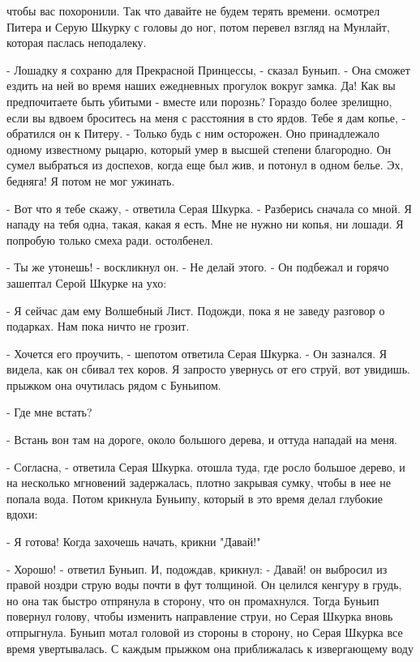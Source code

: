 чтобы вас похоронили. Так что давайте не будем терять времени.
 осмотрел Питера и Серую Шкурку с головы до ног, потом перевел 
взгляд на Мунлайт, которая паслась неподалеку.
\par- Лошадку я сохраню для Прекрасной Принцессы, - сказал Буньип. - 
Она сможет ездить на ней во время наших ежедневных прогулок вокруг 
замка. Да! Как вы предпочитаете быть убитыми - вместе или порознь? 
Гораздо более зрелищно, если вы вдвоем броситесь на меня с расстояния 
в сто ярдов. Тебе я дам копье, - обратился он к Питеру. - Только будь 
с ним осторожен. Оно принадлежало одному известному рыцарю, который 
умер в высшей степени благородно. Он сумел выбраться из доспехов, 
когда еще был жив, и потонул в одном белье. Эх, бедняга! Я потом не 
мог ужинать.
\par- Вот что я тебе скажу, - ответила Серая Шкурка. - Разберись 
сначала со мной. Я нападу на тебя одна, такая, какая я есть. Мне не 
нужно ни копья, ни лошади. Я попробую только смеха ради.
 остолбенел.
\par- Ты же утонешь! - воскликнул он. - Не делай этого. - Он подбежал 
и горячо зашептал Серой Шкурке на ухо:
\par- Я сейчас дам ему Волшебный Лист. Подожди, пока я не заведу 
разговор о подарках. Нам пока ничто не грозит.
\par- Хочется его проучить, - шепотом ответила Серая Шкурка. - Он 
зазнался. Я видела, как он сбивал тех коров. Я запросто увернусь от 
его струй, вот увидишь.
 прыжком она очутилась рядом с Буньипом.
\par- Где мне встать?
\par- Встань вон там на дороге, около большого дерева, и оттуда 
нападай на меня.
\par- Согласна, - ответила Серая Шкурка.
 отошла туда, где росло большое дерево, и на несколько 
мгновений задержалась, плотно закрывая сумку, чтобы в нее не попала 
вода. Потом крикнула Буньипу, который в это время делал глубокие 
вдохи:
\par- Я готова! Когда захочешь начать, крикни "Давай!"
\par- Хорошо! - ответил Буньип. И, подождав, крикнул: - Давай!
 он выбросил из правой ноздри струю воды почти в фут 
толщиной. Он целился кенгуру в грудь, но она так быстро отпрянула в 
сторону, что он промахнулся. Тогда Буньип повернул голову, чтобы 
изменить направление струи, но Серая Шкурка вновь отпрыгнула. Буньип 
мотал головой из стороны в сторону, но Серая Шкурка все время 
увертывалась. С каждым прыжком она приближалась к извергающему воду 
